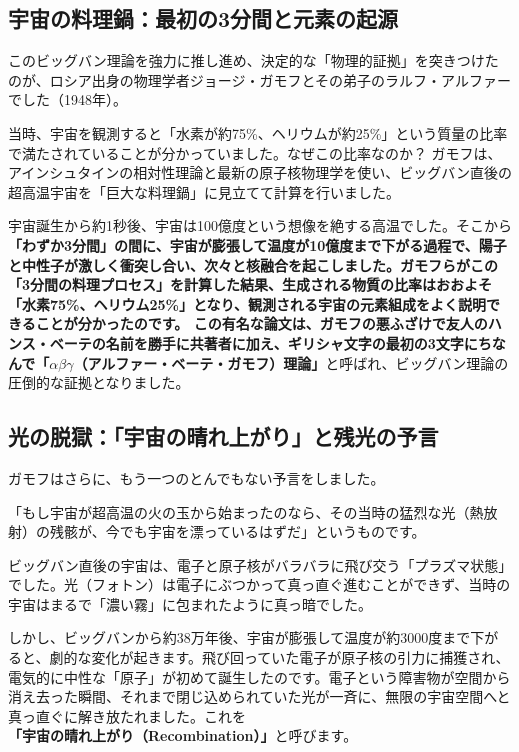 \subsection{宇宙の料理鍋：最初の3分間と元素の起源}

このビッグバン理論を強力に推し進め、決定的な「物理的証拠」を突きつけたのが、ロシア出身の物理学者ジョージ・ガモフとその弟子のラルフ・アルファーでした（1948年）。

当時、宇宙を観測すると「水素が約75\%、ヘリウムが約25\%」という質量の比率で満たされていることが分かっていました。なぜこの比率なのか？ ガモフは、アインシュタインの相対性理論と最新の原子核物理学を使い、ビッグバン直後の超高温宇宙を「巨大な料理鍋」に見立てて計算を行いました。

宇宙誕生から約1秒後、宇宙は100億度という想像を絶する高温でした。そこから\textbf{「わずか3分間」の間に、宇宙が膨張して温度が10億度まで下がる過程で、陽子と中性子が激しく衝突し合い、次々と核融合を起こしました。ガモフらがこの「3分間の料理プロセス」を計算した結果、生成される物質の比率はおおよそ「水素75\%、ヘリウム25\%」となり、観測される宇宙の元素組成をよく説明できることが分かったのです。 この有名な論文は、ガモフの悪ふざけで友人のハンス・ベーテの名前を勝手に共著者に加え、ギリシャ文字の最初の3文字にちなんで「\(\alpha\beta\gamma\)（アルファー・ベーテ・ガモフ）理論」}と呼ばれ、ビッグバン理論の圧倒的な証拠となりました。

\subsection{光の脱獄：「宇宙の晴れ上がり」と残光の予言}

ガモフはさらに、もう一つのとんでもない予言をしました。

「もし宇宙が超高温の火の玉から始まったのなら、その当時の猛烈な光（熱放射）の残骸が、今でも宇宙を漂っているはずだ」というものです。

ビッグバン直後の宇宙は、電子と原子核がバラバラに飛び交う「プラズマ状態」でした。光（フォトン）は電子にぶつかって真っ直ぐ進むことができず、当時の宇宙はまるで「濃い霧」に包まれたように真っ暗でした。

しかし、ビッグバンから約38万年後、宇宙が膨張して温度が約3000度まで下がると、劇的な変化が起きます。飛び回っていた電子が原子核の引力に捕獲され、電気的に中性な「原子」が初めて誕生したのです。電子という障害物が空間から消え去った瞬間、それまで閉じ込められていた光が一斉に、無限の宇宙空間へと真っ直ぐに解き放たれました。これを\textbf{「宇宙の晴れ上がり（Recombination）」}と呼びます。

